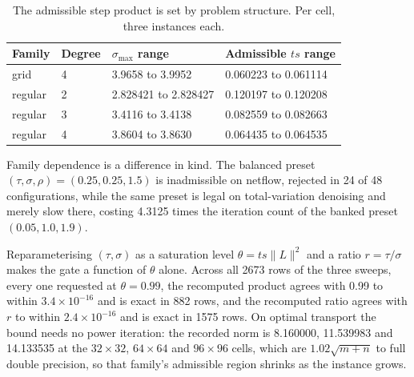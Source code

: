 \begin{table}[t]
\centering
\caption{The admissible step product is set by problem structure. Per cell,
three instances each.}
\label{tab:gate}
\begin{tabular}{@{}llll@{}}
\toprule
Family & Degree & $\sigma_{\max}$ range & Admissible $ts$ range \\
\midrule
grid    & 4 & 3.9658 to 3.9952 & 0.060223 to 0.061114 \\
regular & 2 & 2.828421 to 2.828427 & 0.120197 to 0.120208 \\
regular & 3 & 3.4116 to 3.4138 & 0.082559 to 0.082663 \\
regular & 4 & 3.8604 to 3.8630 & 0.064435 to 0.064535 \\
\bottomrule
\end{tabular}
\end{table}

Family dependence is a difference in kind. The balanced preset
$(\tau,\sigma,\rho) = (0.25, 0.25, 1.5)$ is inadmissible on netflow, rejected in
24 of 48 configurations, while the same preset is legal on total-variation
denoising and merely slow there, costing 4.3125 times the iteration count of the
banked preset $(0.05, 1.0, 1.9)$.

Reparameterising $(\tau, \sigma)$ as a saturation level $\theta = t s \|L\|^2$
and a ratio $r = \tau/\sigma$ makes the gate a function of $\theta$ alone.
Across all 2673 rows of the three sweeps, every one requested at
$\theta = 0.99$, the recomputed product agrees with 0.99 to within
$3.4\times10^{-16}$ and is exact in 882 rows, and the recomputed ratio agrees
with $r$ to within $2.4\times10^{-16}$ and is exact in 1575 rows.
On optimal transport the bound needs no power iteration: the recorded norm is
8.160000, 11.539983 and 14.133535 at the $32\times32$, $64\times64$ and
$96\times96$ cells, which are $1.02\sqrt{m+n}$ to full double precision, so that
family's admissible region shrinks as the instance grows.

